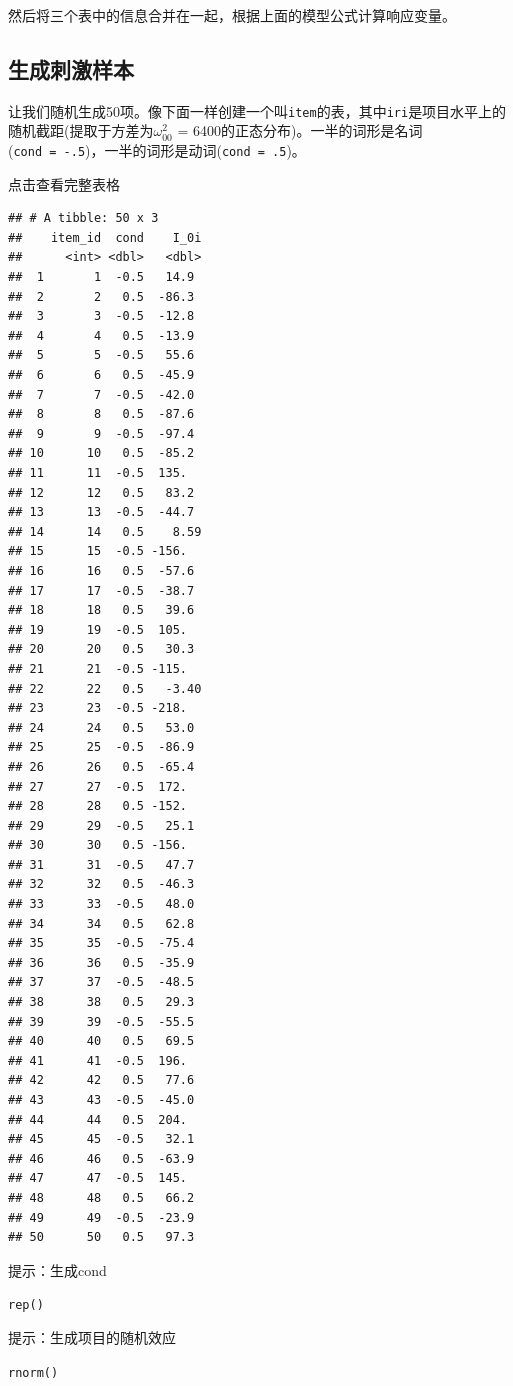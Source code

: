 \documentclass[
]{book}
\begin{document}
然后将三个表中的信息合并在一起，根据上面的模型公式计算响应变量。

\hypertarget{ux751fux6210ux523aux6fc0ux6837ux672c}{%
\subsection{生成刺激样本}\label{ux751fux6210ux523aux6fc0ux6837ux672c}}

让我们随机生成50项。像下面一样创建一个叫\texttt{item}的表，其中\texttt{iri}是项目水平上的随机截距(提取于方差为\(\omega_{00}^2\) = 6400的正态分布)。一半的词形是名词(\texttt{cond\ =\ -.5})，一半的词形是动词(\texttt{cond\ =\ .5})。

点击查看完整表格

\begin{verbatim}
## # A tibble: 50 x 3
##    item_id  cond    I_0i
##      <int> <dbl>   <dbl>
##  1       1  -0.5   14.9 
##  2       2   0.5  -86.3 
##  3       3  -0.5  -12.8 
##  4       4   0.5  -13.9 
##  5       5  -0.5   55.6 
##  6       6   0.5  -45.9 
##  7       7  -0.5  -42.0 
##  8       8   0.5  -87.6 
##  9       9  -0.5  -97.4 
## 10      10   0.5  -85.2 
## 11      11  -0.5  135.  
## 12      12   0.5   83.2 
## 13      13  -0.5  -44.7 
## 14      14   0.5    8.59
## 15      15  -0.5 -156.  
## 16      16   0.5  -57.6 
## 17      17  -0.5  -38.7 
## 18      18   0.5   39.6 
## 19      19  -0.5  105.  
## 20      20   0.5   30.3 
## 21      21  -0.5 -115.  
## 22      22   0.5   -3.40
## 23      23  -0.5 -218.  
## 24      24   0.5   53.0 
## 25      25  -0.5  -86.9 
## 26      26   0.5  -65.4 
## 27      27  -0.5  172.  
## 28      28   0.5 -152.  
## 29      29  -0.5   25.1 
## 30      30   0.5 -156.  
## 31      31  -0.5   47.7 
## 32      32   0.5  -46.3 
## 33      33  -0.5   48.0 
## 34      34   0.5   62.8 
## 35      35  -0.5  -75.4 
## 36      36   0.5  -35.9 
## 37      37  -0.5  -48.5 
## 38      38   0.5   29.3 
## 39      39  -0.5  -55.5 
## 40      40   0.5   69.5 
## 41      41  -0.5  196.  
## 42      42   0.5   77.6 
## 43      43  -0.5  -45.0 
## 44      44   0.5  204.  
## 45      45  -0.5   32.1 
## 46      46   0.5  -63.9 
## 47      47  -0.5  145.  
## 48      48   0.5   66.2 
## 49      49  -0.5  -23.9 
## 50      50   0.5   97.3
\end{verbatim}

提示：生成cond

\texttt{rep()}

提示：生成项目的随机效应

\texttt{rnorm()}
\end{document}
